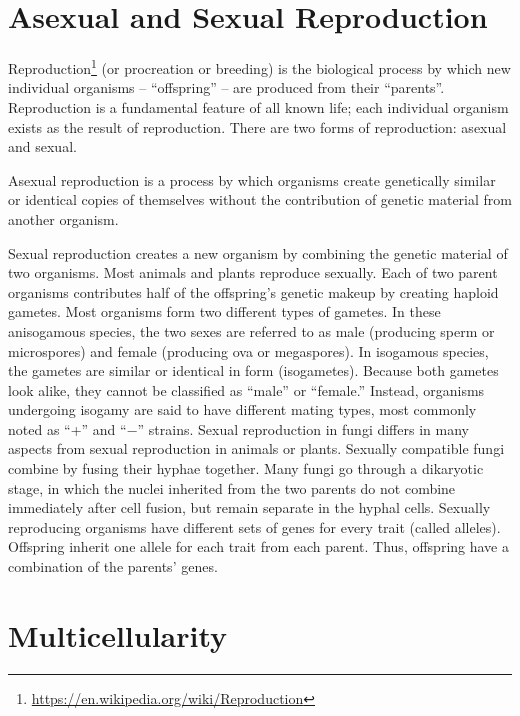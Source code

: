 \documentclass[]{book}
\let\rmarkdownfootnote\footnote%
\def\footnote{\protect\rmarkdownfootnote}
\renewcommand{\href}[2]{#2\footnote{\url{#1}}}
\theoremstyle{definition}
\theoremstyle{definition}
\theoremstyle{definition}
\theoremstyle{remark}
\begin{document}
\section{Asexual and Sexual
Reproduction}\label{asexual-and-sexual-reproduction}

\href{https://en.wikipedia.org/wiki/Reproduction}{Reproduction} (or
procreation or breeding) is the biological process by which new
individual organisms -- ``offspring'' -- are produced from their
``parents''. Reproduction is a fundamental feature of all known life;
each individual organism exists as the result of reproduction. There are
two forms of reproduction: asexual and sexual.

Asexual reproduction is a process by which organisms create genetically
similar or identical copies of themselves without the contribution of
genetic material from another organism.

Sexual reproduction creates a new organism by combining the genetic
material of two organisms. Most animals and plants reproduce sexually.
Each of two parent organisms contributes half of the offspring's genetic
makeup by creating haploid gametes. Most organisms form two different
types of gametes. In these anisogamous species, the two sexes are
referred to as male (producing sperm or microspores) and female
(producing ova or megaspores). In isogamous species, the gametes are
similar or identical in form (isogametes). Because both gametes look
alike, they cannot be classified as ``male'' or ``female.'' Instead,
organisms undergoing isogamy are said to have different mating types,
most commonly noted as ``+'' and ``−'' strains. Sexual reproduction in
fungi differs in many aspects from sexual reproduction in animals or
plants. Sexually compatible fungi combine by fusing their hyphae
together. Many fungi go through a dikaryotic stage, in which the nuclei
inherited from the two parents do not combine immediately after cell
fusion, but remain separate in the hyphal cells. Sexually reproducing
organisms have different sets of genes for every trait (called alleles).
Offspring inherit one allele for each trait from each parent. Thus,
offspring have a combination of the parents' genes.

\section{Multicellularity}\label{multicellularity}
\end{document}
